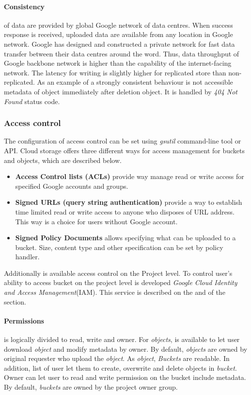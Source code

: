 \documentclass[a4paper,12pt,oneside]{report}
\begin{document}
\paragraph{Consistency} of data are provided by global Google network of data centres. 
When success response is received, uploaded data are available from any location in Google network. Google has designed and constructed a private network 
for fast data transfer between their data centres around the word. Thus, data throughput 
of Google backbone network is higher than the capability of the 
internet-facing network. The latency for writing is slightly higher for replicated store 
than non-replicated. As an example of a strongly consistent behaviour 
is not accessible metadata of object immediately after deletion object. 
It is handled by \textit{404 Not Found} status code.


\subsubsection{Access control}
The configuration of access control can be set using \textit{gsutil} command-line tool 
or API. Cloud storage offers three different ways for access management for buckets and objects, which are described below.
\begin{itemize}
\item\textbf{Access Control lists (ACLs)} provide way manage read or write access for 
specified Google accounts and groups.
\item\textbf{Signed URLs (query string authentication)} provide a way to establish time 
limited read or write access to anyone who disposes of URL address. This way is a choice for users without Google account.   
\item\textbf{Signed Policy Documents} allows specifying what can be uploaded to a bucket. 
Size, content type and other specification can be set by policy handler. 
\end{itemize}
Additionally is available access control on the Project level. To control user's ability 
to access bucket on the project level is developed   \textit{Google Cloud Identity and Access Management}(IAM). This service is described on 
the and of the section.

\paragraph{Permissions} is logically divided to read, write and owner. For \textit{objects}, 
is available to let user download \textit{object} and modify metadata by owner. By default, \textit{objects} are owned by original requester who 
upload the \textit{object}. As \textit{object}, \textit{Buckets} are readable. In addition, list of user let them to create, overwrite and delete objects 
in \textit{bucket}. Owner can let user to read and write permission on the bucket include metadata. By default, \textit{buckets} are owned by the project 
owner group.
\end{document}
